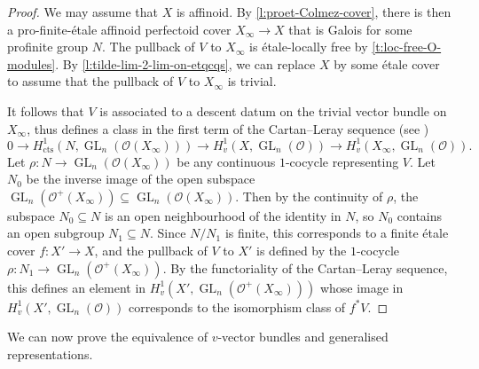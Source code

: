 \documentclass[11pt]{amsart}
\numberwithin{equation}{section}
\theoremstyle{definition}
\theoremstyle{remark}
\newcommand{\lra}{\longrightarrow}
\renewcommand{\O}{\mathcal{O}}
\newcommand{\GL}{\operatorname{GL}}
\newcommand{\cts}{{\operatorname{cts}}}
\begin{document}
\begin{proof}
	We may assume that $X$ is affinoid.
	By \cref{l:proet-Colmez-cover}, there is then a pro-finite-\'etale affinoid perfectoid cover $X_\infty\to X$ that is Galois for some profinite group $N$. The pullback of $V$ to $X_\infty$ is \'etale-locally free by \cref{t:loc-free-O-modules}. By \cref{l:tilde-lim-2-lim-on-etqcqs}, we can replace $X$ by some \'etale cover to assume that the pullback of $V$ to $X_\infty$ is trivial.
	
	It follows that $V$ is associated to a descent datum on the trivial vector bundle on $X_\infty$, thus defines a class in the first term of the Cartan--Leray sequence (see \cite[Proposition~2.8]{heuer-v_lb_rigid})
	\[ 0\lra H^1_{\cts}(N,\GL_n(\O(X_\infty)))\lra H^1_v(X,\GL_n(\O))\lra  H^1_v(X_\infty,\GL_n(\O)).\]
	Let $\rho\colon N\to \GL_n(\O(X_\infty))$ be any continuous $1$-cocycle representing $V$. Let $N_0$ be the inverse image of the open subspace $\GL_n(\O^+(X_\infty))\subseteq \GL_n(\O(X_\infty))$. Then by the continuity of $\rho$, the subspace $N_0\subseteq N$ is an open neighbourhood of the identity in $N$, so $N_0$ contains  an open subgroup $N_1\subseteq N$. Since $N/N_1$ is finite, this corresponds to a finite \'etale cover $f\colon X'\to X$, and the pullback of $V$ to $X'$ is defined by the $1$-cocycle $\rho\colon N_1\to \GL_n(\O^+(X_\infty))$. By the functoriality of the Cartan--Leray sequence, this defines an element in $H^1_v(X',\GL_n(\O^+(X_\infty)))$ whose image in $H^1_v(X',\GL_n(\O))$ corresponds to the isomorphism class of $f^{\ast}V$.
\end{proof}

We can now prove the equivalence of $v$-vector bundles and generalised representations. 
\end{document}
